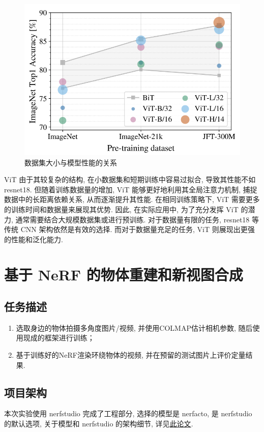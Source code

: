 \documentclass[notitlepage,cs4size,punct,oneside]{ctexrep}
\numberwithin{equation}{chapter}
\theoremstyle{mystyle}
\begin{document}
\begin{figure}[H]
    \centering
    \includegraphics[scale=0.75]{ViT_vs_CNN.png}
    \caption{数据集大小与模型性能的关系}
\end{figure}

ViT 由于其较复杂的结构, 在小数据集和短期训练中容易过拟合, 导致其性能不如 resnet18. 但随着训练数据量的增加, ViT 能够更好地利用其全局注意力机制, 捕捉数据中的长距离依赖关系, 从而逐渐提升其性能. 在相同训练策略下, ViT 需要更多的训练时间和数据量来展现其优势. 因此, 在实际应用中, 为了充分发挥 ViT 的潜力, 通常需要结合大规模数据集或进行预训练. 对于数据量有限的任务, resnet18 等传统 CNN 架构依然是有效的选择. 而对于数据量充足的任务, ViT 则展现出更强的性能和泛化能力.

\chapter{基于 NeRF 的物体重建和新视图合成}
\section{任务描述}
\begin{enumerate}
\item 选取身边的物体拍摄多角度图片/视频, 并使用COLMAP估计相机参数, 随后使用现成的框架进行训练；
\item 基于训练好的NeRF渲染环绕物体的视频, 并在预留的测试图片上评价定量结果.
\end{enumerate}

\section{项目架构}
本次实验使用 nerfstudio 完成了工程部分, 选择的模型是 nerfacto, 是 nerfstudio 的默认选项, 关于模型和 nerfstudio 的架构细节, 详见\href{https://arxiv.org/pdf/2302.04264}{此论文}.
\end{document}
